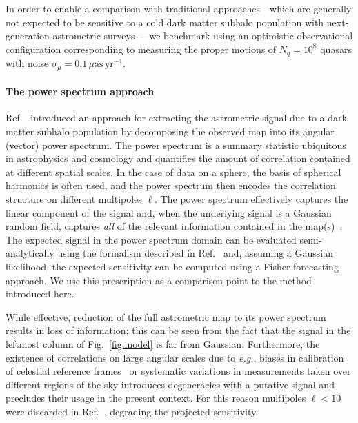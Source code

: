 \documentclass[preprint]{article}
\begin{document}
In order to enable a comparison with traditional approaches---which are generally not expected to be sensitive to a cold dark matter subhalo population with next-generation astrometric surveys~\cite{VanTilburg:2018ykj,Mishra-Sharma:2020ynk}---we benchmark using an optimistic observational configuration corresponding to measuring the proper motions of $N_q = 10^8$ quasars with noise $\sigma_{\mu} = 0.1\,\mu\mathrm{as}\,\mathrm{yr}^{-1}$.

\paragraph{The power spectrum approach} Ref.~\cite{Mishra-Sharma:2020ynk} introduced an approach for extracting the astrometric signal due to a dark matter subhalo population by decomposing the observed map into its angular (vector) power spectrum. The power spectrum is a summary statistic ubiquitous in astrophysics and cosmology and quantifies the amount of correlation contained at different spatial scales. In the case of data on a sphere, the basis of spherical harmonics is often used, and the power spectrum then encodes the correlation structure on different multipoles $\ell$. The power spectrum effectively captures the linear component of the signal and, when the underlying signal is a Gaussian random field, captures \emph{all} of the relevant information contained in the map(s)~\cite{Tegmark:1996qt}.
The expected signal in the power spectrum domain can be evaluated semi-analytically using the formalism described in Ref.~\cite{Mishra-Sharma:2020ynk} and, assuming a Gaussian likelihood, the expected sensitivity can be computed using a Fisher forecasting approach. We use this prescription as a comparison point to the method introduced here.

While effective, reduction of the full astrometric map to its power spectrum results in loss of information; this can be seen from the fact that the signal in the leftmost column of Fig.~\ref{fig:model} is far from Gaussian. Furthermore, the existence of correlations on large angular scales due to \emph{e.g.}, biases in calibration of celestial reference frames~\cite{2018A&A...616A..14G} or systematic variations in measurements taken over different regions of the sky introduces degeneracies with a putative signal and precludes their usage in the present context. For this reason multipoles $\ell < 10$ were discarded in Ref.~\cite{Mishra-Sharma:2020ynk}, degrading the projected sensitivity.
\end{document}
